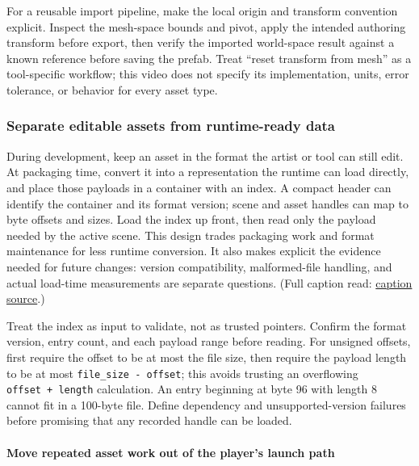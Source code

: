 For a reusable import pipeline, make the local origin and transform convention explicit. Inspect the mesh-space bounds and pivot, apply the intended authoring transform before export, then verify the imported world-space result against a known reference before saving the prefab. Treat ``reset transform from mesh'' as a tool-specific workflow; this video does not specify its implementation, units, error tolerance, or behavior for every asset type.

\subsubsection{Separate editable assets from runtime-ready data}\label{06-engine-ii-ch032-separate-editable-assets-from-runtime-ready-data}

\hypertarget{06-engine-ii-ch032-separate-editable-assets-from-runtime-ready-data}{}

During development, keep an asset in the format the artist or tool can still edit. At packaging time, convert it into a representation the runtime can load directly, and place those payloads in a container with an index. A compact header can identify the container and its format version; scene and asset handles can map to byte offsets and sizes. Load the index up front, then read only the payload needed by the active scene. This design trades packaging work and format maintenance for less runtime conversion. It also makes explicit the evidence needed for future changes: version compatibility, malformed-file handling, and actual load-time measurements are separate questions. (Full caption read: \href{https://www.youtube.com/watch?v=_k4TaZmSteY}{caption source}.)

Treat the index as input to validate, not as trusted pointers. Confirm the format version, entry count, and each payload range before reading. For unsigned offsets, first require the offset to be at most the file size, then require the payload length to be at most \texttt{file\_size\ -\ offset}; this avoids trusting an overflowing \texttt{offset\ +\ length} calculation. An entry beginning at byte 96 with length 8 cannot fit in a 100-byte file. Define dependency and unsupported-version failures before promising that any recorded handle can be loaded.

\paragraph{Move repeated asset work out of the player's launch path}\label{06-engine-ii-ch032-move-repeated-asset-work-out-of-the-players-launch-path}

